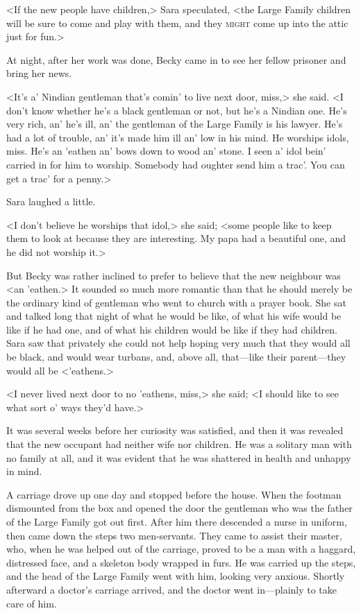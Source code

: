 <If the new people have children,> Sara speculated, <the Large Family children will be sure to come and play with them, and they \textsc{might} come up into the attic just for fun.>

At night, after her work was done, Becky came in to see her fellow prisoner and bring her news.

<It's a' Nindian gentleman that's comin' to live next door, miss,> she said. <I don't know whether he's a black gentleman or not, but he's a Nindian one. He's very rich, an' he's ill, an' the gentleman of the Large Family is his lawyer. He's had a lot of trouble, an' it's made him ill an' low in his mind. He worships idols, miss. He's an 'eathen an' bows down to wood an' stone. I seen a' idol bein' carried in for him to worship. Somebody had oughter send him a trac'. You can get a trac' for a penny.>

Sara laughed a little.

<I don't believe he worships that idol,> she said; <some people like to keep them to look at because they are interesting. My papa had a beautiful one, and he did not worship it.>

But Becky was rather inclined to prefer to believe that the new neighbour was <an 'eathen.> It sounded so much more romantic than that he should merely be the ordinary kind of gentleman who went to church with a prayer book. She sat and talked long that night of what he would be like, of what his wife would be like if he had one, and of what his children would be like if they had children. Sara saw that privately she could not help hoping very much that they would all be black, and would wear turbans, and, above all, that—like their parent—they would all be <'eathens.>

<I never lived next door to no 'eathens, miss,> she said; <I should like to see what sort o' ways they'd have.>

It was several weeks before her curiosity was satisfied, and then it was revealed that the new occupant had neither wife nor children. He was a solitary man with no family at all, and it was evident that he was shattered in health and unhappy in mind.

A carriage drove up one day and stopped before the house. When the footman dismounted from the box and opened the door the gentleman who was the father of the Large Family got out first. After him there descended a nurse in uniform, then came down the steps two men-servants. They came to assist their master, who, when he was helped out of the carriage, proved to be a man with a haggard, distressed face, and a skeleton body wrapped in furs. He was carried up the steps, and the head of the Large Family went with him, looking very anxious. Shortly afterward a doctor's carriage arrived, and the doctor went in—plainly to take care of him.

